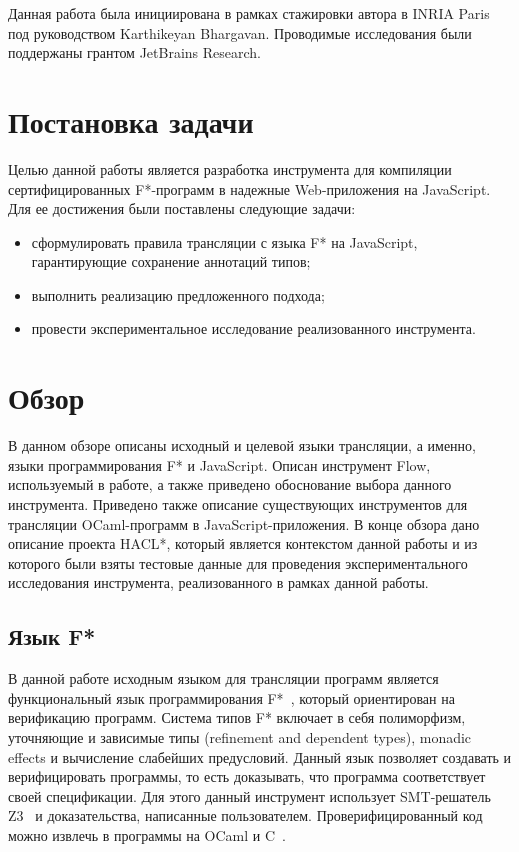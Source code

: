Данная работа была инициирована в рамках стажировки автора в INRIA Paris под руководством Karthikeyan Bhargavan. Проводимые исследования были поддержаны грантом JetBrains Research.

\section{Постановка задачи}
Целью данной работы является разработка инструмента для компиляции сертифицированных F*-программ в надежные Web-приложения на JavaScript. Для ее достижения были поставлены следующие задачи:

\begin{itemize}
\item сформулировать правила трансляции с языка F* на JavaScript, гарантирующие сохранение аннотаций типов;
\item выполнить реализацию предложенного подхода;
\item провести экспериментальное исследование реализованного инструмента.
\end{itemize} 

\section{Обзор}

В данном обзоре описаны исходный и целевой языки трансляции, а именно, языки программирования F* и JavaScript. Описан инструмент Flow, используемый в работе, а также приведено обоснование выбора данного инструмента. Приведено также описание существующих инструментов для трансляции OCaml-программ в JavaScript-приложения. В конце обзора дано описание проекта HACL*, который является контекстом данной работы и из которого были взяты тестовые данные для проведения экспериментального исследования инструмента, реализованного в рамках данной работы. 

\subsection{Язык F*}

В данной работе исходным языком для трансляции программ является функциональный язык программирования F*~\cite{fstargh, fstarCite, fstar}, который ориентирован на верификацию программ. Система типов F* включает в себя полиморфизм, уточняющие и зависимые типы (refinement and dependent types), monadic effects и вычисление слабейших предусловий. Данный язык позволяет создавать и верифицировать программы, то есть доказывать, что программа соответствует своей спецификации. Для этого данный инструмент использует SMT-решатель Z3~\cite{z3Cite} и доказательства, написанные пользователем. Проверифицированный код можно извлечь в программы на OCaml и C~\cite{kremlin}. 

